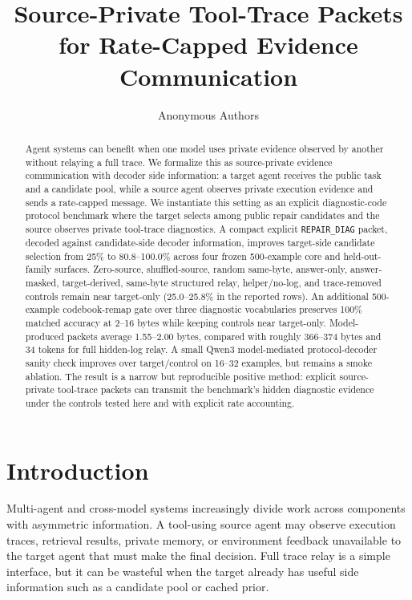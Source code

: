 \documentclass{article}
\title{Source-Private Tool-Trace Packets for Rate-Capped Evidence Communication}
\author{Anonymous Authors}
\newcommand{\diag}{\texttt{REPAIR\_DIAG}}
\begin{document}
\maketitle

\begin{abstract}
Agent systems can benefit when one model uses private evidence observed by
another without relaying a full trace. We formalize this as source-private
evidence communication with decoder side information: a target agent receives
the public task and a candidate pool, while a source agent observes private
execution evidence and sends a rate-capped message. We instantiate this setting
as an explicit diagnostic-code protocol benchmark where the target selects
among public repair candidates and the source observes private tool-trace
diagnostics. A compact explicit \diag{} packet, decoded against candidate-side
decoder information, improves target-side candidate selection from 25\% to
80.8--100.0\% across four frozen 500-example core and held-out-family surfaces.
Zero-source, shuffled-source, random same-byte, answer-only, answer-masked,
target-derived, same-byte structured relay, helper/no-log, and trace-removed
controls remain near target-only
(25.0--25.8\% in the reported rows).
An additional 500-example codebook-remap gate over three diagnostic
vocabularies preserves 100\% matched accuracy at 2--16 bytes while keeping
controls near target-only.
Model-produced packets average 1.55--2.00 bytes, compared with roughly
366--374 bytes and 34 tokens for full hidden-log relay. A small Qwen3
model-mediated protocol-decoder sanity check improves over target/control on
16--32 examples, but remains a smoke ablation. The result is a narrow but
reproducible positive method: explicit source-private tool-trace packets can
transmit the benchmark's hidden diagnostic evidence under the controls tested
here and with explicit rate accounting.
\end{abstract}

\section{Introduction}

Multi-agent and cross-model systems increasingly divide work across components
with asymmetric information. A tool-using source agent may observe execution
traces, retrieval results, private memory, or environment feedback unavailable
to the target agent that must make the final decision. Full trace relay is a
simple interface, but it can be wasteful when the target already has useful side
information such as a candidate pool or cached prior.
\end{document}
